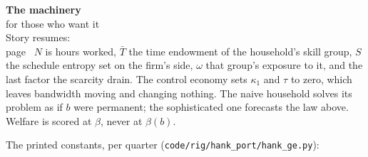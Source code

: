 \begin{machinery}{\textbf{The machinery}\\for those who want it\\[3pt]{\color{muted}Story resumes:\\page~\pageref{ch15}}}
\noindent \(N\) is hours worked, \(\bar{T}\) the time endowment of the household's skill group, \(S\) the schedule entropy set on the firm's side, \(\omega\) that group's exposure to it, and the last factor the scarcity drain. The control economy sets \(\kappa_1\) and \(\tau\) to zero, which leaves bandwidth moving and changing nothing. The naive household solves its problem as if \(b\) were permanent; the sophisticated one forecasts the law above. Welfare is scored at \(\beta\), never at \(\beta(b)\).

\tableneed{82pt}

The printed constants, per quarter (\texttt{code/\allowbreak{}rig/\allowbreak{}hank\_\allowbreak{}port/\allowbreak{}hank\_\allowbreak{}ge.\allowbreak{}py}):

\begin{booktable}
\tablerule\nobreak
{}\tablehair\nobreak
{}\tablehair
{}\tablehair
{}\tablehair

\end{booktable}
\end{machinery}
